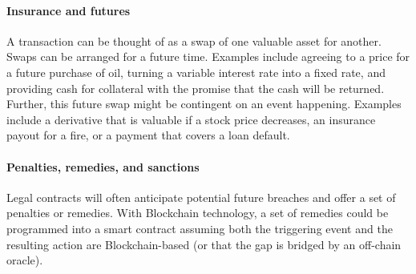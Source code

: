 \paragraph{Insurance and futures}
A transaction can be thought of as a swap of one valuable asset for another. Swaps can be arranged for a future time.
Examples include agreeing to a price for a future purchase of oil, turning a variable interest rate into a fixed rate, and providing cash for collateral with the promise that the cash will be returned.
Further, this future swap might be contingent on an event happening. 
Examples include a derivative that is valuable if a stock price decreases, an insurance payout for a fire, or a payment that covers a loan default.


\paragraph{Penalties, remedies, and sanctions}

Legal contracts will often anticipate potential future breaches and offer a set of penalties or remedies.
With Blockchain technology, a set of remedies could be programmed into a smart contract assuming both the triggering event and the resulting action are Blockchain-based (or that the gap is bridged by an off-chain oracle).

